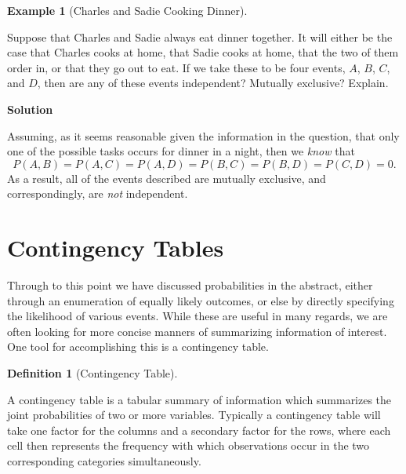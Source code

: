\documentclass[
  letterpaper,
  DIV=11,
  numbers=noendperiod]{scrreprt}
\theoremstyle{definition}
\newtheorem{definition}{Definition}[chapter]
\theoremstyle{definition}
\theoremstyle{definition}
\newtheorem{example}{Example}[chapter]
\theoremstyle{remark}
\begin{document}
\begin{example}[Charles and Sadie Cooking
Dinner]\protect\hypertarget{exm-independence-two}{}\label{exm-independence-two}

Suppose that Charles and Sadie always eat dinner together. It will
either be the case that Charles cooks at home, that Sadie cooks at home,
that the two of them order in, or that they go out to eat. If we take
these to be four events, \(A\), \(B\), \(C\), and \(D\), then are any of
these events independent? Mutually exclusive? Explain.

\begin{tcolorbox}[enhanced jigsaw, colback=white, breakable, rightrule=.15mm, leftrule=.75mm, toprule=.15mm, left=2mm, arc=.35mm, opacityback=0, bottomrule=.15mm]

\vspace{-3mm}\textbf{Solution}\vspace{3mm}

Assuming, as it seems reasonable given the information in the question,
that only one of the possible tasks occurs for dinner in a night, then
we \emph{know} that
\[P(A,B) = P(A,C) = P(A,D) = P(B,C) = P(B,D) = P(C,D) = 0.\] As a
result, all of the events described are mutually exclusive, and
correspondingly, are \emph{not} independent.

\end{tcolorbox}

\end{example}

\section{Contingency Tables}\label{contingency-tables}

Through to this point we have discussed probabilities in the abstract,
either through an enumeration of equally likely outcomes, or else by
directly specifying the likelihood of various events. While these are
useful in many regards, we are often looking for more concise manners of
summarizing information of interest. One tool for accomplishing this is
a contingency table.

\begin{definition}[Contingency
Table]\protect\hypertarget{def-contingency-table}{}\label{def-contingency-table}

A contingency table is a tabular summary of information which summarizes
the joint probabilities of two or more variables. Typically a
contingency table will take one factor for the columns and a secondary
factor for the rows, where each cell then represents the frequency with
which observations occur in the two corresponding categories
simultaneously.

\end{definition}
\end{document}
